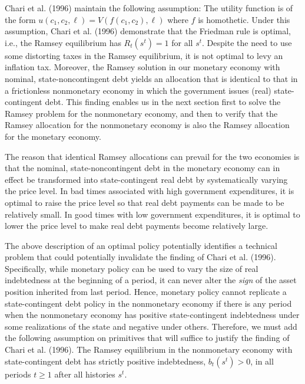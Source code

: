 Chari et al. (1996) maintain the following assumption:
\medskip
{}  The utility function is of the form
$u(c_1, c_2, \ell) = V( f(c_1, c_2), \ell )$
where $f$ is homothetic.
\medskip
\noindent
Under this assumption,  Chari et al. (1996) demonstrate
that the Friedman rule is optimal, i.e., the Ramsey equilibrium has
$R_t(s^t)=1$ for all $s^t$.
Despite the need to use some distorting taxes in the Ramsey equilibrium, it is
not optimal to levy an inflation tax. Moreover, the Ramsey solution
in our monetary economy with nominal, state-noncontingent debt yields an
allocation that is identical to that in a frictionless nonmonetary economy in
which the government issues (real) state-contingent debt. This finding enables us
in the next section first to  solve the Ramsey problem for the nonmonetary  economy, and then
to verify that the  Ramsey allocation for the nonmonetary economy  is also the Ramsey allocation for the monetary economy.

The reason that identical Ramsey allocations can prevail for the two economies is that the nominal, state-noncontingent debt in
the monetary economy can in effect be transformed into state-contingent real debt by
systematically varying the price level. In bad times associated  with high government
expenditures, it is optimal to raise the price level so that  real debt payments can be made to be relatively small.
In good times with low government expenditures, it is optimal to lower the price level to make  real
debt payments become  relatively large.

The above description of an optimal policy potentially identifies a technical  problem that could potentially  invalidate
the finding of Chari et al. (1996). Specifically, while monetary policy can be used
to vary the size of real indebtedness at the beginning of a period, it can never alter
 the {\it  sign \/} of the asset position  inherited from  last period. Hence,
monetary policy cannot replicate a state-contingent debt policy in the nonmonetary economy
if there is any period when the nonmonetary economy has positive state-contingent indebtedness
under some realizations of the state and negative under others. Therefore, we must add the
following  assumption on primitives that will suffice to justify  the finding of
Chari et al. (1996).
\medskip
{}  The Ramsey equilibrium in the nonmonetary economy with
state-contingent debt has strictly positive indebtedness, $b_{t}(s^{t})>0$, in all
periods $t\geq1$ after all histories $s^{t}$.




